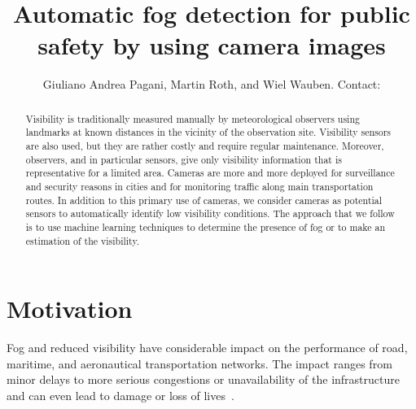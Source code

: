 \documentclass{article}
\title{Automatic fog detection for public safety by using camera images}
\author{Giuliano Andrea Pagani\affil{1}, Martin Roth\affil{1}, and Wiel Wauben\affil{1}. Contact: \email{pagani@knmi.nl}}
\begin{document}
\maketitle

\begin{abstract}
Visibility is traditionally measured manually by meteorological observers using landmarks at known distances in
the vicinity of the observation site. 
Visibility sensors are also used, but they are rather costly and
require regular maintenance. Moreover, observers, and in particular sensors, give only visibility information that is
representative for a limited area. 
Cameras are more and more deployed for surveillance and security reasons in cities and for monitoring traffic along
main transportation routes. In addition to this primary use of cameras, we consider cameras as potential sensors to
automatically identify low visibility conditions. 
The approach that we follow is to use machine learning techniques
to determine the presence of fog or to make an estimation of the visibility. 
\end{abstract}

\bcols %

\section*{Motivation}
Fog and reduced visibility have considerable impact on the performance of road, maritime, and aeronautical transportation
networks. The impact ranges from minor delays to more serious congestions or unavailability of the
infrastructure and can even lead to damage or loss of lives~\cite{gultepe2007fog}.
\end{document}
